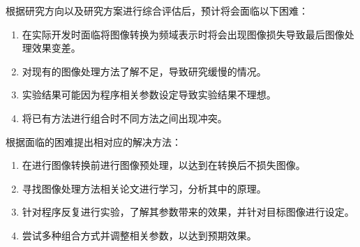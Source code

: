 
根据研究方向以及研究方案进行综合评估后，预计将会面临以下困难：
\begin{enumerate}[label=\arabic*)]
    \item 在实际开发时面临将图像转换为频域表示时将会出现图像损失导致最后图像处理效果变差。
    \item 对现有的图像处理方法了解不足，导致研究缓慢的情况。
    \item 实验结果可能因为程序相关参数设定导致实验结果不理想。
    \item 将已有方法进行组合时不同方法之间出现冲突。
\end{enumerate}

\newpage

根据面临的困难提出相对应的解决方法：
\begin{enumerate}[label=\arabic*)]
    \item 在进行图像转换前进行图像预处理，以达到在转换后不损失图像。
    \item 寻找图像处理方法相关论文进行学习，分析其中的原理。
    \item 针对程序反复进行实验，了解其参数带来的效果，并针对目标图像进行设定。
    \item 尝试多种组合方式并调整相关参数，以达到预期效果。
\end{enumerate}